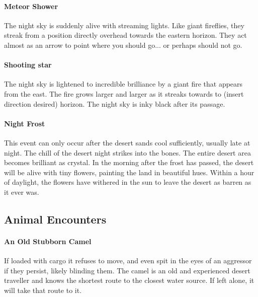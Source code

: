 \paragraph{Meteor Shower} The night sky is suddenly alive with streaming lights. Like giant fireflies, they streak from a position directly overhead towards the eastern horizon. They act almost as an arrow to point where you should go... or perhaps should not go. 

\paragraph{Shooting star} The night sky is lightened to incredible brilliance by a giant fire that appears from the east. The fire grows larger and larger as it streaks towards to (insert direction desired) horizon. The night sky is inky black after its passage.

\paragraph{Night Frost} This event can only occur after the desert sands cool sufficiently, usually late at night. The chill of the desert night strikes into the bones. The entire desert area becomes brilliant as crystal. In the morning after the frost has passed, the desert will be alive with tiny flowers, painting the land in beautiful hues. Within a hour of daylight, the flowers have withered in the sun to leave the desert as barren as it ever was.

\subsection{Animal Encounters}

\paragraph{An Old Stubborn Camel} If loaded with cargo it refuses to move, and even spit in the eyes of an aggressor if they persist, likely blinding them. The camel is an old and experienced desert traveller and knows the shortest route to the closest water source. If left alone, it will take that route to it.